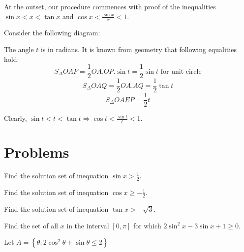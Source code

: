 At the outset, our procedure commences with proof of the inequalities $\sin x < x < \tan x$ and $\cos x <
\frac{\sin x}{x} < 1$.

Consider the following diagram:

\startplacefigure
  \externalfigure[35_2.pdf]
\stopplacefigure

The angle $t$ is in radians. It is known from geometry that following equalities hold:
$$S_\Delta OAP = \frac{1}{2}OA.OP.\sin t = \frac{1}{2}\sin t\text{ for unit circle}$$
$$S_\Delta OAQ = \frac{1}{2}OA.AQ = \frac{1}{2}\tan t$$
$$S_\Delta OAEP = \frac{1}{2}t$$

Clearly, $\sin t < t < \tan t\Rightarrow \cos t < \frac{\sin t}{t} < 1$.

\section{Problems}
\startitemize[n, 1*broad]
\item Find the solution set of inequation $\sin x > \frac{1}{2}$.
\item Find the solution set of inequation $\cos x \geq -\frac{1}{2}$.
\item Find the solution set of inequation $\tan x > -\sqrt{3}$.
\item Find the set of all $x$ in the interval $[0, \pi]$ for which $2\sin^2x - 3\sin x + 1\geq 0$.
\item Let $A = \left\{\theta: 2\cos^2\theta + \sin\theta \leq 2\right\}$

